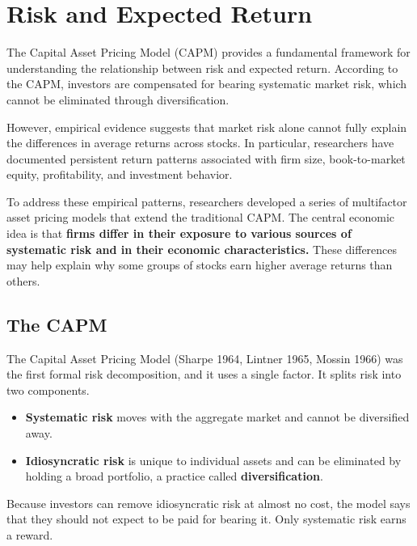 \section{Risk and Expected Return}
\label{sec:04-decomposition}


The Capital Asset Pricing Model (CAPM) provides a fundamental framework for understanding the relationship between risk and expected return. According to the CAPM, investors are compensated for bearing systematic market risk, which cannot be eliminated through diversification. 

However, empirical evidence suggests that market risk alone cannot fully explain the differences in average returns across stocks. In particular, researchers have documented persistent return patterns associated with firm size, book-to-market equity, profitability, and investment behavior.

To address these empirical patterns, researchers developed a series of multifactor asset pricing models that extend the traditional CAPM. The central economic idea is that \textbf{firms differ in their exposure to various sources of systematic risk and in their economic characteristics.} These differences may help explain why some groups of stocks earn higher average returns than others.


\subsection{The CAPM}
\label{sec:04-capm}
The Capital Asset Pricing Model (Sharpe 1964, Lintner 1965, Mossin 1966) was the first formal risk decomposition, and it uses a single factor. It splits risk into two components.
\begin{itemize}
\item \textbf{Systematic risk} moves with the aggregate market and cannot be diversified away. 
\item \textbf{Idiosyncratic risk} is unique to individual assets and can be eliminated by holding a broad portfolio, a practice called \textbf{diversification}. 
\end{itemize}
Because investors can remove idiosyncratic risk at almost no cost, the model says that they should not expect to be paid for bearing it. Only systematic risk earns a reward.


